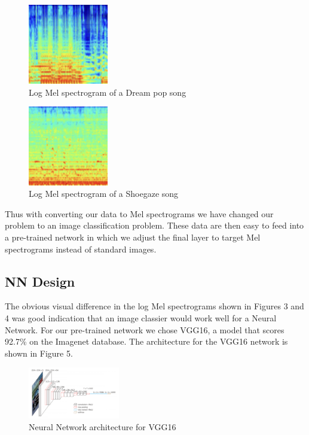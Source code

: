 \documentclass[letterpaper, 12 pt, conference]{ieeeconf}  %
\begin{document}
\begin{figure}
\begin{center}
    \includegraphics[width=3.5cm]{dreampop_spectrogram.png}
\caption{Log Mel spectrogram of a Dream pop song}
\end{center}

\end{figure}


\begin{figure}
\begin{center}
    \includegraphics[width=3.5cm]{shoegaze_spectrogram.png}
\caption{Log Mel spectrogram of a Shoegaze song}
\end{center}
\end{figure}


Thus with converting our data to Mel spectrograms we have changed our problem to an image classification problem. These data are then easy to feed into a pre-trained network in which we adjust the final layer to target Mel spectrograms instead of standard images. 

\subsection{NN Design}

The obvious visual difference in the log Mel spectrograms shown in Figures 3 and 4 was good indication that an image classier would work well for a Neural Network. For our pre-trained network we chose VGG16, a model that scores 92.7\% on the Imagenet database. The architecture for the VGG16 network is shown in Figure 5.

\begin{figure}
\begin{center}
    \includegraphics[width=4cm]{VGG16acc.png}
\caption{Neural Network architecture for VGG16}
\end{center}
\end{figure}
\end{document}

